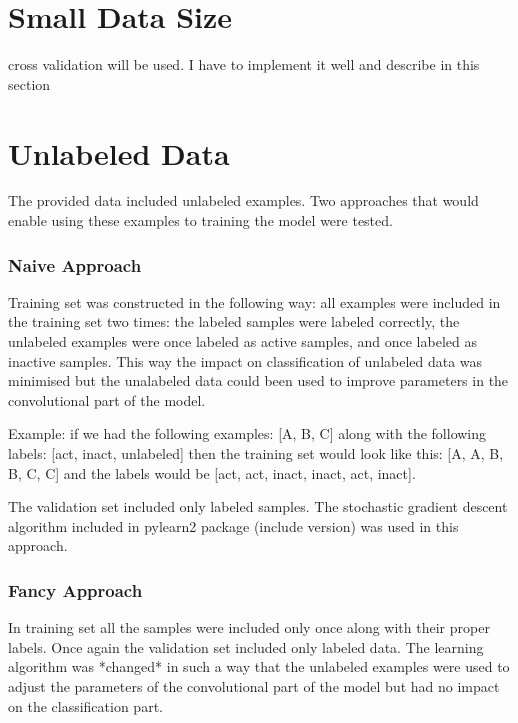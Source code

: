 \documentclass[a4paper,10pt]{report}
\begin{document}
      \section{Small Data Size}
      cross validation will be used. I have to implement it well and describe in this section
      
      \section{Unlabeled Data}
      The provided data included unlabeled examples. Two approaches that would enable using these examples to training the model were tested.
      
      \subsubsection{Naive Approach}
      Training set was constructed in the following way: all examples were included in the training set two times: the labeled samples were labeled correctly, the unlabeled examples were once labeled as active samples, and once labeled as inactive samples. This way the impact on classification of unlabeled data was minimised but the unalabeled data could been used to improve parameters in the convolutional part of the model.
           

      Example: if we had the following examples: [A, B, C] along with the following labels: [act, inact, unlabeled] then the training set would look like this: [A, A, B, B, C, C] and the labels would be [act, act, inact, inact, act, inact].
      
      The validation set included only labeled samples. The stochastic gradient descent algorithm included in pylearn2 package (include version) was used in this approach.
      
      \subsubsection{Fancy Approach}
      In training set all the samples were included only once along with their proper labels. Once again the validation set included only labeled data. The learning algorithm was *changed* in such a way that the unlabeled examples were used to adjust the parameters of the convolutional part of the model but had no impact on the classification part.
      
\end{document}
